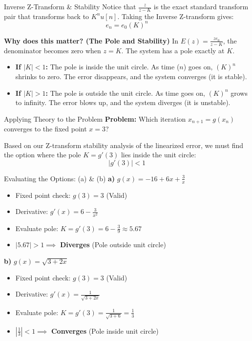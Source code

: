\documentclass{beamer}
\begin{document}
\begin{frame}{Inverse Z-Transform \& Stability}
    Notice that $\frac{z}{z-K}$ is the exact standard transform pair that transforms back to $K^n u[n]$. Taking the Inverse Z-transform gives:
    $$e_n = e_0 (K)^n$$
    
    \textbf{Why does this matter? (The Pole and Stability)}
    In $E(z) = \frac{z e_0}{z - K}$, the denominator becomes zero when $z = K$. The system has a pole exactly at $K$.
    
    \begin{itemize}
        \item \textbf{If $|K| < 1$:} The pole is inside the unit circle. As time ($n$) goes on, $(K)^n$ shrinks to zero. The error disappears, and the system converges (it is stable).
        \item \textbf{If $|K| > 1$:} The pole is outside the unit circle. As time goes on, $(K)^n$ grows to infinity. The error blows up, and the system diverges (it is unstable).
    \end{itemize}
\end{frame}

\begin{frame}{Applying Theory to the Problem}
    \textbf{Problem:} Which iteration $x_{n+1} = g(x_n)$ converges to the fixed point $x = 3$?
    
    Based on our Z-transform stability analysis of the linearized error, we must find the option where the pole $K = g'(3)$ lies inside the unit circle:
    $$|g'(3)| < 1$$
\end{frame}

\begin{frame}{Evaluating the Options: (a) \& (b)}
    \textbf{a)} $g(x) = -16 + 6x + \frac{3}{x}$
    \begin{itemize}
        \item Fixed point check: $g(3) = 3$ (Valid)
        \item Derivative: $g'(x) = 6 - \frac{3}{x^2}$
        \item Evaluate pole: $K = g'(3) = 6 - \frac{3}{9} \approx 5.67$
        \item $|5.67| > 1 \implies$ \textbf{Diverges} (Pole outside unit circle)
    \end{itemize}
    
    \vspace{0.3cm}
    \textbf{b)} $g(x) = \sqrt{3 + 2x}$
    \begin{itemize}
        \item Fixed point check: $g(3) = 3$ (Valid)
        \item Derivative: $g'(x) = \frac{1}{\sqrt{3 + 2x}}$
        \item Evaluate pole: $K = g'(3) = \frac{1}{\sqrt{3 + 6}} = \frac{1}{3}$
        \item $|\frac{1}{3}| < 1 \implies$ \textbf{Converges} (Pole inside unit circle)
    \end{itemize}
\end{frame}
\end{document}
